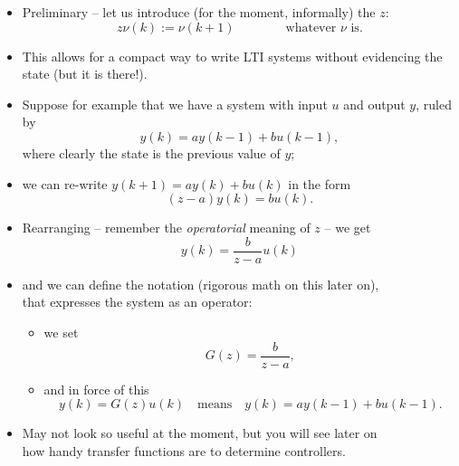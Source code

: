 \begin{frame}
\myPause
 \begin{itemize}[<+-| alert@+>]
 \item Preliminary -- let us introduce (for the moment, informally) the  $z$:
       \begin{displaymath}
        z\nu(k) := \nu(k+1) \qquad\qquad \text{whatever $\nu$ is}.
       \end{displaymath}
 \item This allows for a compact way to write LTI systems without evidencing the state (but it is there!).
 \item Suppose for example that we have a system with input $u$ and output $y$, ruled by
       \begin{displaymath}
        y(k) = ay(k-1)+bu(k-1),
       \end{displaymath}
       where clearly the state is the previous value of $y$;
 \item we can re-write $y(k+1)=ay(k)+bu(k)$ in the form
       \begin{displaymath}
        (z-a)y(k) = bu(k).
       \end{displaymath}
 \end{itemize}
\end{frame}

\begin{frame}
\framesubtitleTC{}
\myPause
 \begin{itemize}[<+-| alert@+>]
 \item Rearranging -- remember the \emph{operatorial} meaning of $z$ -- we get
       \begin{displaymath}
        y(k) = \frac{b}{z-a}u(k)
       \end{displaymath}
\item[] and we can define the  notation (rigorous math on this later on),\\
       that expresses the system as an operator:
       \begin{itemize}[<+-| alert@+>]
       \item we set
             \begin{displaymath}
               G(z) = \frac{b}{z-a},
             \end{displaymath}
       \item[] and in force of this
             \begin{displaymath}
              y(k) = G(z)u(k) \quad \text{means} \quad y(k) = ay(k-1)+bu(k-1).
             \end{displaymath}
       \end{itemize}
 \item \vfill May not look so useful at the moment, but you will see later on\\
       how handy transfer functions are to determine controllers.
 \end{itemize}
\end{frame}
